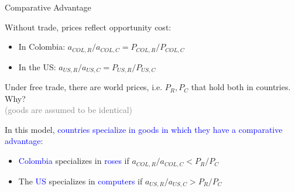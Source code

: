 \documentclass[notes,11pt, aspectratio=169, xcolor=table]{beamer}
\newcommand{\blue}[1]{\textcolor{blue}{#1}}
\newcommand{\blue}[1]{\textcolor{blue}{#1}}
\newenvironment{wideitemize}{\itemize\addtolength{\itemsep}{10pt}}{\enditemize}
\begin{document}
\begin{frame}{Comparative Advantage}

\begin{wideitemize}

    \item Without trade, prices reflect opportunity cost:
    \begin{itemize}
        \item In Colombia: $a_{COL,R}/a_{COL,C} = P_{COL,R}/P_{COL,C}$
        \item In the US: $a_{US,R}/a_{US,C} = P_{US,R}/P_{US,C}$
    \end{itemize}

    \item Under free trade, there are world prices, i.e. $P_R,P_C$ that hold both in countries. Why? \\
        \qquad \textcolor{gray}{(goods are assumed to be identical)}

    \item In this model, \blue{countries specialize in goods in which they have a comparative advantage}:
    
    \begin{itemize}
        \item \blue{Colombia} specializes in \blue{roses} if $a_{COL,R}/a_{COL,C} < P_R/P_C$
        \item The \blue{US} specializes in \blue{computers} if $a_{US,R}/a_{US,C} > P_R/P_C$
    \end{itemize}

\end{wideitemize}

\end{frame}
\end{document}
